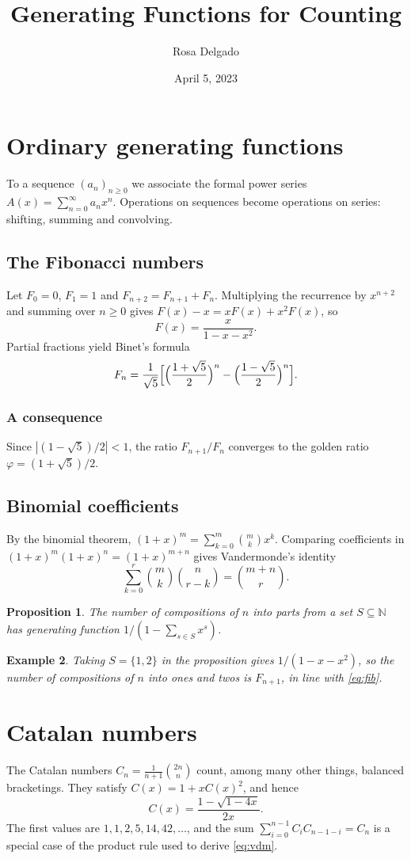 \documentclass[11pt,letterpaper]{article}
\title{Generating Functions for Counting}
\author{Rosa Delgado}
\date{April 5, 2023}
\newtheorem{proposition}{Proposition}
\newtheorem{example}[proposition]{Example}
\newcommand{\N}{\mathbb{N}}
\begin{document}
\maketitle

\section{Ordinary generating functions}
To a sequence $(a_n)_{n\ge0}$ we associate the formal power series $A(x)=\sum_{n=0}^{\infty}a_nx^n$. Operations on sequences become operations on series: shifting, summing and convolving.

\subsection{The Fibonacci numbers}
Let $F_0=0$, $F_1=1$ and $F_{n+2}=F_{n+1}+F_n$. Multiplying the recurrence by $x^{n+2}$ and summing over $n\ge0$ gives $F(x)-x=xF(x)+x^2F(x)$, so
\begin{equation}\label{eq:fib}
  F(x)=\frac{x}{1-x-x^2}.
\end{equation}
Partial fractions yield Binet's formula
\[
  F_n=\frac{1}{\sqrt5}\Bigl[\Bigl(\frac{1+\sqrt5}{2}\Bigr)^{n}-\Bigl(\frac{1-\sqrt5}{2}\Bigr)^{n}\Bigr].
\]

\subsubsection{A consequence}
Since $|(1-\sqrt5)/2|<1$, the ratio $F_{n+1}/F_n$ converges to the golden ratio $\varphi=(1+\sqrt5)/2$.

\subsection{Binomial coefficients}
By the binomial theorem, $(1+x)^m=\sum_{k=0}^{m}\binom{m}{k}x^k$. Comparing coefficients in $(1+x)^m(1+x)^n=(1+x)^{m+n}$ gives Vandermonde's identity
\begin{equation}\label{eq:vdm}
  \sum_{k=0}^{r}\binom{m}{k}\binom{n}{r-k}=\binom{m+n}{r}.
\end{equation}

\begin{proposition}
The number of compositions of $n$ into parts from a set $S\subseteq\N$ has generating function $1/(1-\sum_{s\in S}x^s)$.
\end{proposition}

\begin{example}
Taking $S=\{1,2\}$ in the proposition gives $1/(1-x-x^2)$, so the number of compositions of $n$ into ones and twos is $F_{n+1}$, in line with \eqref{eq:fib}.
\end{example}

\section{Catalan numbers}
The Catalan numbers $C_n=\frac{1}{n+1}\binom{2n}{n}$ count, among many other things, balanced bracketings. They satisfy $C(x)=1+xC(x)^2$, and hence
\[
  C(x)=\frac{1-\sqrt{1-4x}}{2x}.
\]
The first values are $1,1,2,5,14,42,\dots$, and the sum $\sum_{i=0}^{n-1}C_iC_{n-1-i}=C_n$ is a special case of the product rule used to derive \eqref{eq:vdm}.
\end{document}
